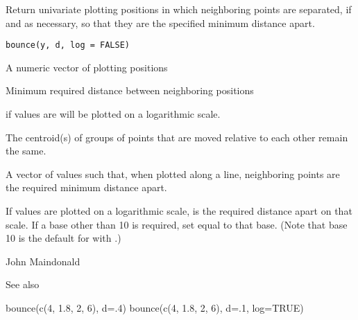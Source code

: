\begin{Description}\relax
Return univariate plotting positions in which neighboring points are
separated, if and as necessary, so that they are the specified minimum
distance apart.
\end{Description}
\begin{Usage}
\begin{verbatim}
bounce(y, d, log = FALSE)
\end{verbatim}
\end{Usage}
\begin{Arguments}
\begin{ldescription}
\item[\code{y}] A numeric vector of plotting positions
\item[\code{d}] Minimum required distance between neighboring positions
\item[\code{log}]  if values are will be plotted on a logarithmic scale.
\end{ldescription}
\end{Arguments}
\begin{Details}\relax
The centroid(s) of groups of points that are moved relative to each
other remain the same.
\end{Details}
\begin{Value}
A vector of values such that, when plotted along a line, neighboring
points are the required minimum distance apart.
\end{Value}
\begin{Note}\relax
If values are plotted on a logarithmic scale,  is the required
distance apart on that scale. If a base other than 10 is required, set
 equal to that base.  (Note that base 10 is the default for
 with .)
\end{Note}
\begin{Author}\relax
John Maindonald
\end{Author}
\begin{SeeAlso}\relax
See also 
\end{SeeAlso}
\begin{Examples}
\begin{ExampleCode}
bounce(c(4, 1.8, 2, 6), d=.4)
bounce(c(4, 1.8, 2, 6), d=.1, log=TRUE)
\end{ExampleCode}
\end{Examples}

